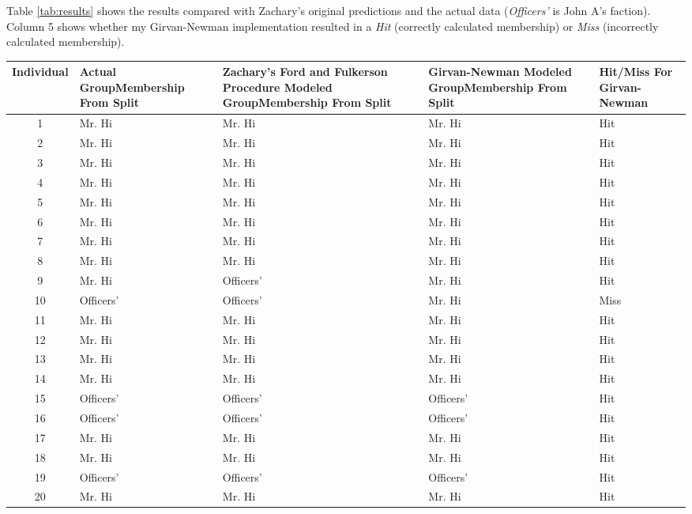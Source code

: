Table \ref{tab:results} shows the results compared with Zachary's original predictions and the actual data (\emph{Officers'} is John A's faction). Column 5 shows whether my Girvan-Newman implementation resulted in a \emph{Hit} (correctly calculated membership) or \emph{Miss} (incorrectly calculated membership).
\clearpage
\begin{table}
\centering
\small
\begin{tabular}{ | c | p{2cm} | p{2cm} | p{2cm} | p{2cm} | }
\hline
Individual & Actual Group\newline Membership From Split & Zachary's Ford and Fulkerson Procedure Modeled Group\newline Membership From Split & Girvan-Newman Modeled Group\newline Membership From Split & Hit/Miss For Girvan-Newman\\
\hline
1 & Mr. Hi & Mr. Hi & Mr. Hi & Hit \\
\hline
2 & Mr. Hi & Mr. Hi & Mr. Hi & Hit \\
\hline
3 & Mr. Hi & Mr. Hi & Mr. Hi & Hit \\
\hline
4 & Mr. Hi & Mr. Hi & Mr. Hi & Hit \\
\hline
5 & Mr. Hi & Mr. Hi & Mr. Hi & Hit \\
\hline
6 & Mr. Hi & Mr. Hi & Mr. Hi & Hit \\
\hline
7 & Mr. Hi & Mr. Hi & Mr. Hi & Hit \\
\hline
8 & Mr. Hi & Mr. Hi & Mr. Hi & Hit \\
\hline
9 & Mr. Hi & Officers' & Mr. Hi & Hit \\
\hline
10 & Officers' & Officers' & Mr. Hi & Miss \\
\hline
11 & Mr. Hi & Mr. Hi & Mr. Hi & Hit \\
\hline
12 & Mr. Hi & Mr. Hi & Mr. Hi & Hit \\
\hline
13 & Mr. Hi & Mr. Hi & Mr. Hi & Hit \\
\hline
14 & Mr. Hi & Mr. Hi & Mr. Hi & Hit \\
\hline
15 & Officers' & Officers' & Officers' & Hit \\
\hline
16 & Officers' & Officers' & Officers' & Hit \\
\hline
17 & Mr. Hi & Mr. Hi & Mr. Hi & Hit \\
\hline
18 & Mr. Hi & Mr. Hi & Mr. Hi & Hit \\
\hline
19 & Officers' & Officers' & Officers' & Hit \\
\hline
20 & Mr. Hi & Mr. Hi & Mr. Hi & Hit \\

\end{tabular}
\end{table}

